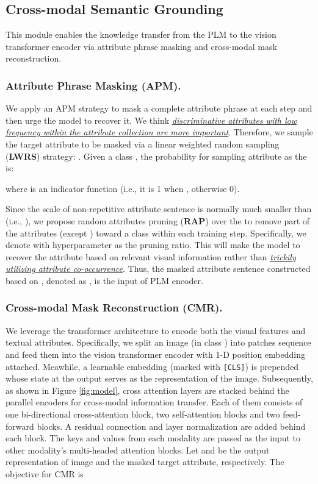 \documentclass[letterpaper]{article} \usepackage{aaai23}  \usepackage{times}  \usepackage{helvet}  \usepackage{courier}  \usepackage[hyphens]{url}  \usepackage{graphicx} \urlstyle{rm} \def\UrlFont{\rm}  \usepackage{natbib}  \usepackage{caption} \frenchspacing  \setlength{\pdfpagewidth}{8.5in}  \setlength{\pdfpageheight}{11in}  \usepackage{algorithm}
\newcommand{\wen}[1]{{\color{black}#1}}
\newcommand{\fy}[1]{{\color{black}#1}}
\begin{document}
\subsection{Cross-modal Semantic Grounding} \label{sec:CSG}
\wen{This module enables the knowledge transfer from the PLM to the vision transformer encoder via attribute phrase masking and cross-modal mask reconstruction.}
\subsubsection{\textbf{Attribute Phrase Masking (APM).}} 
{We apply }
an
APM strategy to mask a complete attribute phrase at each step \fy{and} then urge the model to recover it.
\wen{We think \ul{\emph{discriminative  attributes with low frequency within the attribute collection are more important}}. Therefore,}
we sample the target attribute  to be masked via a linear weighted random sampling (\textbf{LWRS}) strategy:
.
Given \wen{a} class , 
the probability  for sampling attribute  as the   is:

where  is an indicator function (i.e., it is 1 when , otherwise 0). 

Since 
the scale of non-repetitive attribute sentence  is normally much smaller than   (i.e., ), 
 we propose random attributes pruning (\textbf{RAP})  over the  to remove part of the attributes (except ) toward a class within each training step.
Specifically, we denote  with hyperparameter  as the pruning ratio.
\wen{This will make }
the model to recover the attribute based on relevant visual information rather than 
\ul{\emph{trickily utilizing attribute co-occurrence}}.
\wen{Thus, the masked attribute sentence constructed based on , denoted as ,
is the input of PLM encoder.
}
\subsubsection{\textbf{Cross-modal Mask Reconstruction (CMR).}} \label{sec:CMR}
We leverage the transformer architecture to encode both the visual features and textual attributes.
Specifically, we split an image  (in class ) into patches sequence 
 and 
{feed} them into the vision transformer encoder
with 1-D position embedding attached.
Meawhile, a learnable embedding  (marked with {\tt [CLS]}) is prepended 
whose state at the output serves as the representation of the image. 
Subsequently, as shown in Figure \ref{fig:model},  cross attention layers are stacked behind the parallel encoders for cross-modal information transfer. Each of them consists of one bi-directional cross-attention block, two self-attention blocks and two feed-forward blocks. A residual connection and layer normalization are added behind each block.
The keys and values \cite{DBLP:conf/nips/VaswaniSPUJGKP17} from each modality are passed as the input to other modality’s multi-headed attention blocks.
Let
 and  be the output representation of image  and the masked target attribute, respectively.
\wen{T}he objective  for CMR is
\end{document}
